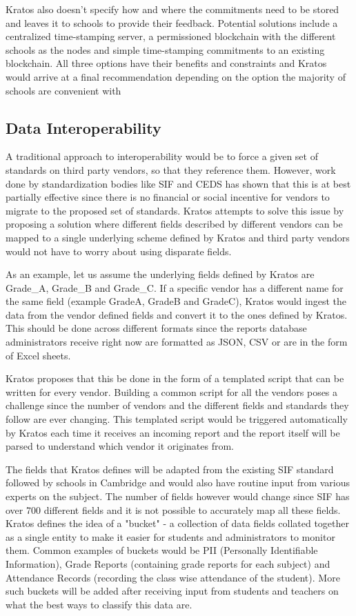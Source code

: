 \documentclass{article}
\begin{document}
\bigbreak
Kratos also doesn't specify how and where the commitments need to be stored and leaves it to schools to provide their feedback. Potential solutions include a centralized time-stamping server, a permissioned blockchain with the different schools as the nodes and simple time-stamping commitments to an existing blockchain. All three options have their benefits and constraints and Kratos would arrive at a final recommendation depending on the option the majority of schools are convenient with
\bigbreak

\subsection{Data Interoperability}
A traditional approach to interoperability would be to force a given set of standards on third party vendors, so that they reference them. However, work done by standardization bodies like SIF and CEDS has shown that this is at best partially effective since there is no financial or social incentive for vendors to migrate to the proposed set of standards. Kratos attempts to solve this issue by proposing a solution where different fields described by different vendors can be mapped to a single underlying scheme defined by Kratos and third party vendors would not have to worry about using disparate fields.

\bigbreak
As an example, let us assume the underlying fields defined by Kratos are Grade\_A, Grade\_B and Grade\_C. If a specific vendor has a different name for the same field (example GradeA, GradeB and GradeC), Kratos would ingest the data from the vendor defined fields and convert it to the ones defined by Kratos. This should be done across different formats since the reports database administrators receive right now are formatted as JSON, CSV or are in the form of Excel sheets.

\bigbreak
Kratos proposes that this be done in the form of a templated script that can be written for every vendor. Building a common script for all the vendors poses a challenge since the number of vendors and the different fields and standards they follow are ever changing. This templated script would be triggered automatically by Kratos each time it receives an incoming report and the report itself will be parsed to understand which vendor it originates from.

\bigbreak
The fields that Kratos defines will be adapted from the existing SIF standard followed by schools in Cambridge and would also have routine input from various experts on the subject. The number of fields however would change since SIF has over 700 different fields and it is not possible to accurately map all these fields. Kratos defines the idea of a "bucket" - a collection of data fields collated together as a single entity to make it easier for students and administrators to monitor them. Common examples of buckets would be PII (Personally Identifiable Information), Grade Reports (containing grade reports for each subject) and Attendance Records (recording the class wise attendance of the student). More such buckets will be added after receiving input from students and teachers on what the best ways to classify this data are.
\end{document}
